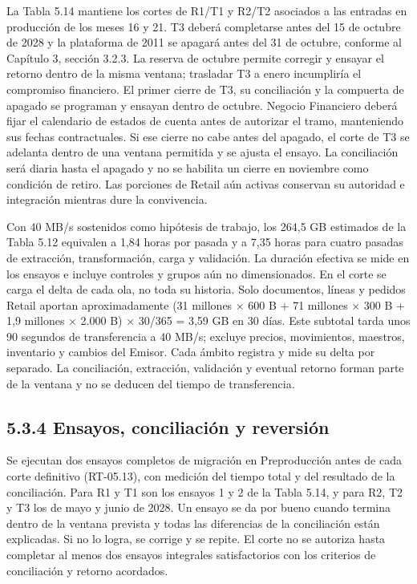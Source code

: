 \documentclass[11pt]{article}
\begin{document}
La Tabla 5.14 mantiene los cortes de R1/T1 y R2/T2 asociados a las entradas en producción de los meses 16 y 21. T3 deberá completarse antes del 15 de octubre de 2028 y la plataforma de 2011 se apagará antes del 31 de octubre, conforme al Capítulo 3, sección 3.2.3. La reserva de octubre permite corregir y ensayar el retorno dentro de la misma ventana; trasladar T3 a enero incumpliría el compromiso financiero. El primer cierre de T3, su conciliación y la compuerta de apagado se programan y ensayan dentro de octubre. Negocio Financiero deberá fijar el calendario de estados de cuenta antes de autorizar el tramo, manteniendo sus fechas contractuales. Si ese cierre no cabe antes del apagado, el corte de T3 se adelanta dentro de una ventana permitida y se ajusta el ensayo. La conciliación será diaria hasta el apagado y no se habilita un cierre en noviembre como condición de retiro. Las porciones de Retail aún activas conservan su autoridad e integración mientras dure la convivencia.

Con 40 MB/s sostenidos como hipótesis de trabajo, los 264,5 GB estimados de la Tabla 5.12 equivalen a 1,84 horas por pasada y a 7,35 horas para cuatro pasadas de extracción, transformación, carga y validación. La duración efectiva se mide en los ensayos e incluye controles y grupos aún no dimensionados. En el corte se carga el delta de cada ola, no toda su historia. Solo documentos, líneas y pedidos Retail aportan aproximadamente (31 millones × 600 B + 71 millones × 300 B + 1,9 millones × 2.000 B) × 30/365 = 3,59 GB en 30 días. Este subtotal tarda unos 90 segundos de transferencia a 40 MB/s; excluye precios, movimientos, maestros, inventario y cambios del Emisor. Cada ámbito registra y mide su delta por separado. La conciliación, extracción, validación y eventual retorno forman parte de la ventana y no se deducen del tiempo de transferencia.

\subsection{5.3.4 Ensayos, conciliación y reversión}

Se ejecutan dos ensayos completos de migración en Preproducción antes de cada corte definitivo (RT-05.13), con medición del tiempo total y del resultado de la conciliación. Para R1 y T1 son los ensayos 1 y 2 de la Tabla 5.14, y para R2, T2 y T3 los de mayo y junio de 2028. Un ensayo se da por bueno cuando termina dentro de la ventana prevista y todas las diferencias de la conciliación están explicadas. Si no lo logra, se corrige y se repite. El corte no se autoriza hasta completar al menos dos ensayos integrales satisfactorios con los criterios de conciliación y retorno acordados.
\end{document}
